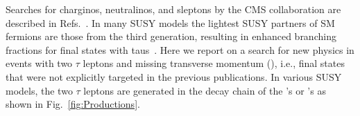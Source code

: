 Searches for charginos, neutralinos, and sleptons by the CMS collaboration are described in Refs.~\cite{Khachatryan:2014qwa,Khachatryan:2014mma,Khachatryan:2015kxa}.
In many SUSY models  the lightest SUSY partners of SM fermions are those from the third generation,
resulting in enhanced branching fractions for final states with taus~\cite{Martin:1997ns}.  Here we report on a search for new physics in events
with two $\tau$ leptons and missing transverse momentum (\MPT), i.e., final states that were not explicitly targeted in the previous publications.
In various SUSY models, the two $\tau$ leptons are generated in the decay chain of the \sTau's or \PSGcpDo's as shown in Fig.~\ref{fig:Productions}. 



